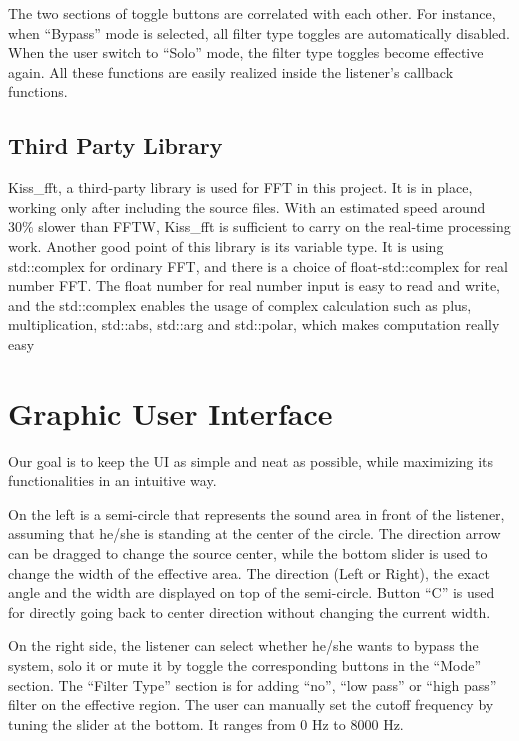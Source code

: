 \documentclass{sig-alternate}
\begin{document}
The two sections of toggle buttons are correlated with each other. For instance, when “Bypass” mode is selected, all filter type toggles are automatically disabled. When the user switch to “Solo” mode, the filter type toggles become effective again. All these functions are easily realized inside the listener’s callback functions.


\subsection{Third Party Library}

Kiss\_fft, a third-party library is used for FFT in this project. It is in place, working only after including the source files. With an estimated speed around 30\% slower than FFTW, Kiss\_fft is sufficient to carry on the real-time processing work. Another good point of this library is its variable type. It is using std::complex for ordinary FFT, and there is a choice of float-std::complex for real number FFT. The float number for real number input is easy to read and write, and the std::complex enables the usage of complex calculation such as plus, multiplication, std::abs, std::arg and std::polar, which makes computation really easy


\section{Graphic User Interface}\label{sec:GUI}

Our goal is to keep the UI as simple and neat as possible, while maximizing its functionalities in an intuitive way. 

On the left is a semi-circle that represents the sound area in front of the listener, assuming that he/she is standing at the center of the circle. The direction arrow can be dragged to change the source center, while the bottom slider is used to change the width of the effective area. The direction (Left or Right), the exact angle and the width are displayed on top of the semi-circle. Button “C” is used for directly going back to center direction without changing the current width.

On the right side, the listener can select whether he/she wants to bypass the system, solo it or mute it by toggle the corresponding buttons in the “Mode” section. The “Filter Type” section is for adding “no”, “low pass” or “high pass” filter on the effective region. The user can manually set the cutoff frequency by tuning the slider at the bottom. It ranges from 0 Hz to 8000 Hz. 
\end{document}
